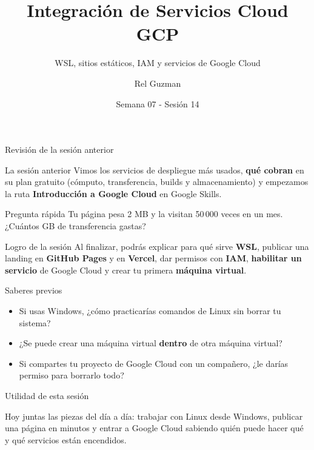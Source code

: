 \documentclass[aspectratio=169,10pt,c]{beamer}
\title{Integración de Servicios Cloud GCP}
\subtitle{WSL, sitios estáticos, IAM y servicios de Google Cloud}
\date{Semana 07 - Sesión 14}
\author{Rel Guzman}
\begin{document}
{\maketitle}

\begin{frame}[c]{Revisión de la sesión anterior}
\begin{block}{La sesión anterior}
\small Vimos los servicios de despliegue más usados, \textbf{qué cobran} en su plan gratuito (cómputo, transferencia, builds y almacenamiento) y empezamos la ruta \textbf{Introducción a Google Cloud} en Google Skills.
\end{block}
\begin{alertblock}{Pregunta rápida}
\small Tu página pesa 2 MB y la visitan 50\,000 veces en un mes. ¿Cuántos GB de transferencia gastas?
\end{alertblock}
\end{frame}

\begin{frame}[c]
\begin{block}{Logro de la sesión}
Al finalizar, podrás explicar para qué sirve \textbf{WSL}, publicar una landing en \textbf{GitHub Pages} y en \textbf{Vercel}, dar permisos con \textbf{IAM}, \textbf{habilitar un servicio} de Google Cloud y crear tu primera \textbf{máquina virtual}.
\end{block}
\end{frame}

\begin{frame}{Saberes previos}
\begin{itemize}\setlength\itemsep{10pt}
  \item Si usas Windows, ¿cómo practicarías comandos de Linux sin borrar tu sistema?
  \item ¿Se puede crear una máquina virtual \textbf{dentro} de otra máquina virtual?
  \item Si compartes tu proyecto de Google Cloud con un compañero, ¿le darías permiso para borrarlo todo?
\end{itemize}
\end{frame}

\begin{frame}[c]{Utilidad de esta sesión}
\begin{center}
\begin{minipage}{.86\textwidth}
{\large Hoy juntas las piezas del día a día: trabajar con Linux desde Windows, publicar una página en minutos y entrar a Google Cloud sabiendo quién puede hacer qué y qué servicios están encendidos.}
\end{minipage}
\end{center}
\end{frame}
\end{document}
